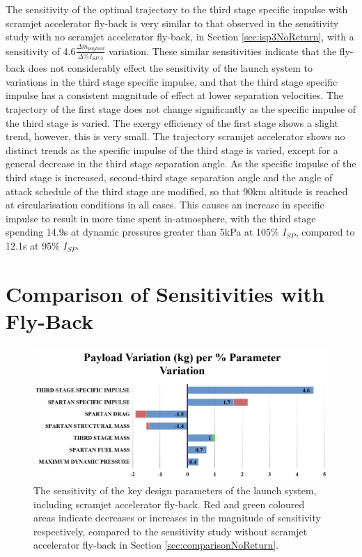 The sensitivity of the optimal trajectory to the third stage specific impulse with scramjet accelerator fly-back is very similar to that observed in the sensitivity study with no scramjet accelerator fly-back, in Section \ref{sec:isp3NoReturn}, with a sensitivity of 4.6$\frac{\Delta m_{payload}}{\Delta\%I_{SP,3}}$ variation. 
 These similar sensitivities indicate that the fly-back does not considerably effect the sensitivity of the launch system to variations in the third stage specific impulse, and that the third stage specific impulse has a consistent magnitude of effect at lower separation velocities. 
The trajectory of the first stage does not change significantly as the specific impulse of the third stage is varied. 
The exergy efficiency of the first stage shows a slight trend, however, this is very small. 
The trajectory scramjet accelerator shows no distinct trends as the specific impulse of the third stage is varied, except for a general decrease in the third stage separation angle.
As the specific impulse of the third stage is increased, second-third stage separation angle and the angle of attack schedule of the third stage are modified, so that 90km altitude is reached at circularisation conditions in all cases. This causes an increase in specific impulse to result in more time spent in-atmosphere, with the third stage spending 14.9s at dynamic pressures greater than 5kPa at 105\% $I_{SP}$, compared to 12.1s at 95\% $I_{SP}$. 






\section{Comparison of Sensitivities with Fly-Back}

\begin{figure}[th]
	\centering
	\includegraphics[width=0.99\linewidth]{figures/6_FlyBack/BarChart}
	\caption{The sensitivity of the key design parameters of the launch system, including scramjet accelerator fly-back. Red and green coloured areas indicate decreases or increases in the magnitude of sensitivity respectively, compared to the sensitivity study without scramjet accelerator fly-back in Section \ref{sec:comparisonNoReturn}.}
	\label{fig:BarChartreturn}
\end{figure}

